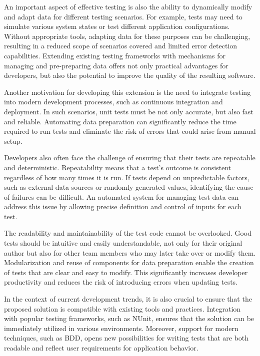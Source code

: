 An important aspect of effective testing is also the ability to dynamically modify and adapt data for different testing scenarios. For example, tests may need to simulate various system states or test different application configurations. Without appropriate tools, adapting data for these purposes can be challenging, resulting in a reduced scope of scenarios covered and limited error detection capabilities. Extending existing testing frameworks with mechanisms for managing and pre-preparing data offers not only practical advantages for developers, but also the potential to improve the quality of the resulting software.

Another motivation for developing this extension is the need to integrate testing into modern development processes, such as continuous integration and deployment. In such scenarios, unit tests must be not only accurate, but also fast and reliable. Automating data preparation can significantly reduce the time required to run tests and eliminate the risk of errors that could arise from manual setup.

Developers also often face the challenge of ensuring that their tests are repeatable and deterministic. Repeatability means that a test's outcome is consistent regardless of how many times it is run. If tests depend on unpredictable factors, such as external data sources or randomly generated values, identifying the cause of failures can be difficult. An automated system for managing test data can address this issue by allowing precise definition and control of inputs for each test.

The readability and maintainability of the test code cannot be overlooked. Good tests should be intuitive and easily understandable, not only for their original author but also for other team members who may later take over or modify them. Modularization and reuse of components for data preparation enable the creation of tests that are clear and easy to modify. This significantly increases developer productivity and reduces the risk of introducing errors when updating tests.

In the context of current development trends, it is also crucial to ensure that the proposed solution is compatible with existing tools and practices. Integration with popular testing frameworks, such as NUnit, ensures that the solution can be immediately utilized in various environments. Moreover, support for modern techniques, such as \acf{BDD}, opens new possibilities for writing tests that are both readable and reflect user requirements for application behavior.

